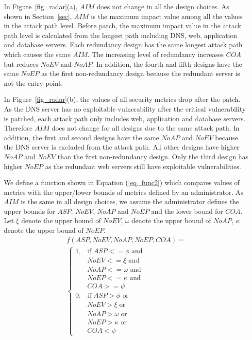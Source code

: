 \documentclass[conference]{IEEEtran}
\begin{document}
In Figure~\ref{fig_radar}(a), $\mathit{AIM}$ does not change in all the design choices. As shown in Section~\ref{sec}, $\mathit{AIM}$ is the maximum impact value among all the values in the attack path level. Before patch, the maximum impact value in the attack path level is calculated from the longest path including DNS, web, application and database servers. Each redundancy design has the same longest attack path which causes the same $\mathit{AIM}$. The increasing level of redundancy increases $\mathit{COA}$ but reduces $\mathit{NoEV}$ and $\mathit{NoAP}$. In addition, the fourth and fifth designs have the same $\mathit{NoEP}$ as the first non-redundancy design because the redundant server is not the entry point.

In Figure~\ref{fig_radar}(b), the values of all security metrics drop after the patch. As the DNS server has no exploitable vulnerability after the critical vulnerability is patched, each attack path only includes web, application and database servers. Therefore $\mathit{AIM}$ does not change for all designs due to the same attack path. In addition, the first and second designs have the same $\mathit{NoAP}$ and $\mathit{NoEV}$ because the DNS server is excluded from the attack path. All other designs have higher $\mathit{NoAP}$ and $\mathit{NoEV}$ than the first non-redundancy design. Only the third design has higher $\mathit{NoEP}$ as the redundant web servers still have exploitable vulnerabilities.

We define a function shown in Equation (\ref{eq_func2}) which compares values of metrics with the upper/lower bounds of metrics defined by an administrator. As $\mathit{AIM}$ is the same in all design choices, we assume the administrator defines the upper bounds for $\mathit{ASP}$, $\mathit{NoEV}$, $\mathit{NoAP}$ and $\mathit{NoEP}$ and the lower bound for $\mathit{COA}$. Let $\xi$ denote the upper bound of $\mathit{NoEV}$, $\omega$ denote the upper bound of $\mathit{NoAP}$, $\kappa$ denote the upper bound of $\mathit{NoEP}$.
\begin{multline} \label{eq_func2}
f(\mathit{ASP}, \mathit{NoEV}, \mathit{NoAP}, \mathit{NoEP}, \mathit{COA})=\\
\left\{
\begin{array}{ll}
1,&\text{if } \mathit{ASP} <= \phi \text{ and }\\
&\mathit{NoEV} <= \xi \text{ and }\\
&\mathit{NoAP} <= \omega \text{ and }\\
&\mathit{NoEP} <= \kappa \text{ and }\\
&\mathit{COA} >= \psi\\
0,& \text{if } \mathit{ASP} > \phi \text{ or }\\
&\mathit{NoEV} > \xi \text{ or }\\
&\mathit{NoAP} > \omega \text{ or }\\
&\mathit{NoEP} > \kappa \text{ or }\\
&\mathit{COA} < \psi
\end{array}
\right.
\end{multline}
\end{document}
